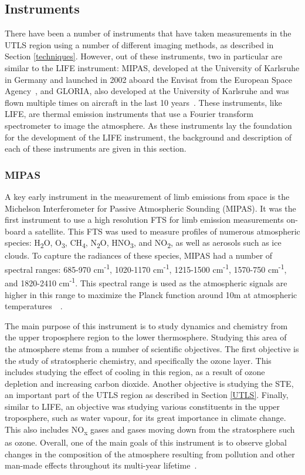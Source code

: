 \subsection{Instruments} \label{instruments} 
There have been a number of instruments that have taken measurements in the UTLS region using a number of different imaging methods, as described in Section \ref{techniques}. However, out of these instruments, two in particular are similar to the LIFE instrument: MIPAS, developed at the University of Karlsruhe in Germany and launched in 2002 aboard the Envisat from the European Space Agency~\citep{MIPAS_instrument}, and GLORIA, also developed at the University of Karlsruhe and was flown multiple times on aircraft in the last 10 years~\citep{GLORIA_concept}. These instruments, like LIFE, are thermal emission instruments that use a Fourier transform spectrometer to image the atmosphere. As these instruments lay the foundation for the development of the LIFE instrument, the background and description of each of these instruments are given in this section.

\subsubsection{MIPAS}
A key early instrument in the measurement of limb emissions from space is the Michelson Interferometer for Passive Atmospheric Sounding (MIPAS). It was the first instrument to use a high resolution FTS for limb emission measurements on-board a satellite. This FTS was used to measure profiles of numerous atmospheric species: H\textsubscript{2}O, O\textsubscript{3}, CH\textsubscript{4}, N\textsubscript{2}O, HNO\textsubscript{3}, and NO\textsubscript{2}, as well as aerosols such as ice clouds. To capture the radiances of these species, MIPAS had a number of spectral ranges: 685-970 cm\textsuperscript{-1}, 1020-1170 cm\textsuperscript{-1}, 1215-1500 cm\textsuperscript{-1}, 1570-750 cm\textsuperscript{-1}, and 1820-2410 cm\textsuperscript{-1}. This spectral range is used as the atmospheric signals are higher in this range to maximize the Planck function around 10\textmu m at atmospheric temperatures~\citep{MIPAS_instrument}~\citep{MIPAS_conference}.

The main purpose of this instrument is to study dynamics and chemistry from the upper troposphere region to the lower thermosphere. Studying this area of the atmosphere stems from a number of scientific objectives. The first objective is the study of stratospheric chemistry, and specifically the ozone layer. This includes studying the effect of cooling in this region, as a result of ozone depletion and increasing carbon dioxide. Another objective is studying the STE, an important part of the UTLS region as described in Section \ref{UTLS}. Finally, similar to LIFE, an objective was studying various constituents in the upper troposphere, such as water vapour, for its great importance in climate change. This also includes NO\textsubscript{x} gases and gases moving down from the stratosphere such as ozone. Overall, one of the main goals of this instrument is to observe global changes in the composition of the atmosphere resulting from pollution and other man-made effects throughout its multi-year lifetime~\citep{MIPAS_instrument}.

